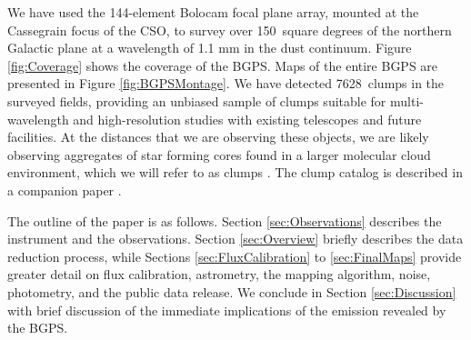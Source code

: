 \documentclass[12pt,preprint]{aastex}
\def\bgps{BGPS}
\newcommand{\bgpsarea}{150}
\newcommand{\ncores}{7628}
\begin{document}
We have used the 144-element Bolocam focal plane array, mounted at the
Cassegrain focus of the CSO, to survey over \bgpsarea\
square degrees of the northern Galactic plane at a wavelength of 1.1
mm in the dust continuum.  Figure \ref{fig:Coverage} shows the
coverage of the \bgps.  Maps of the entire BGPS are presented in
Figure \ref{fig:BGPSMontage}.  We have detected \ncores\ clumps in the
surveyed fields, providing an unbiased sample of clumps suitable for
multi-wavelength and high-resolution studies with existing telescopes
and future facilities.  At the distances that we are observing these
objects, we are likely observing aggregates of star forming cores
found in a larger molecular cloud environment, which we will refer to
as clumps \citep{williams00}.  The clump catalog is described in a
companion paper \citep{rosolowsky09}.

The outline of the paper is as follows. Section \ref{sec:Observations}
describes the instrument and the observations.  Section
\ref{sec:Overview} briefly describes the data reduction process, while
Sections \ref{sec:FluxCalibration} to \ref{sec:FinalMaps} provide
greater detail on flux calibration, astrometry, the mapping algorithm,
noise, photometry, and the public data release.  We conclude in
Section \ref{sec:Discussion} with brief discussion of the immediate
implications of the emission revealed by the BGPS.


\end{document}
